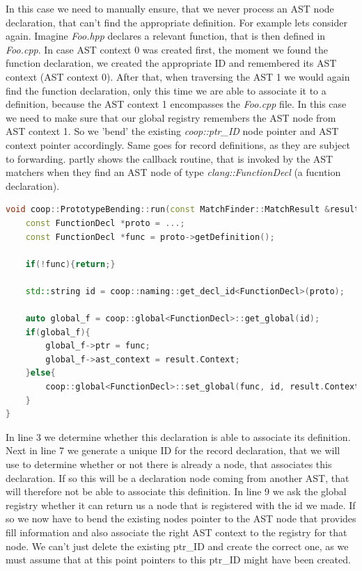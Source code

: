 In this case we need to manually ensure, that we never process an AST node declaration, that can't find the appropriate definition. For example lets consider  again. Imagine \textit{Foo.hpp} declares a relevant function, that is then defined in \textit{Foo.cpp}. In case AST context 0 was created first, the moment we found the function declaration, we created the appropriate ID and remembered its AST context (AST context 0). After that, when traversing the AST 1 we would again find the function declaration, only this time we are able to associate it to a definition, because the AST context 1 encompasses the \textit{Foo.cpp} file. In this case we need to make sure that our global registry remembers the AST node from AST context 1. So we 'bend' the existing \textit{coop::ptr\_ID} node pointer and AST context pointer accordingly. Same goes for record definitions, as they are subject to forwarding.  partly shows the callback routine, that is invoked by the AST matchers when they find an AST node of type \textit{clang::FunctionDecl} (a fucntion declaration).
\begin{lstlisting}[language=C++, name={Shortened excerpt of the callback routine, that registers function declarations for COOP in the data aggregation step.},label={bending}]
void coop::PrototypeBending::run(const MatchFinder::MatchResult &result){
	const FunctionDecl *proto = ...;
	const FunctionDecl *func = proto->getDefinition();
	
	if(!func){return;}

	std::string id = coop::naming::get_decl_id<FunctionDecl>(proto);
	
	auto global_f = coop::global<FunctionDecl>::get_global(id);
	if(global_f){
		global_f->ptr = func;
		global_f->ast_context = result.Context;
	}else{
		coop::global<FunctionDecl>::set_global(func, id, result.Context);
	}
}
\end{lstlisting}
In line 3 we determine whether this declaration is able to associate its definition. Next in line 7 we generate a unique ID for the record declaration, that we will use to determine whether or not there is already a node, that associates this declaration. If so this will be a declaration node coming from another AST, that will therefore not be able to associate this definition. In line 9 we ask the global registry whether it can return us a node that is registered with the id we made. If so we now have to bend the existing nodes pointer to the AST node that provides fill information and also associate the right AST context to the registry for that node. We can't just delete the existing ptr\_ID and create the correct one, as we must assume that at this point pointers to this ptr\_ID might have been created.


